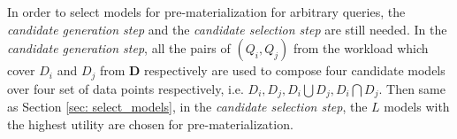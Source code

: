 In order to select models for pre-materialization for arbitrary queries, the {\em candidate generation step} and the {\em candidate selection step} are still needed. In the {\em candidate generation step}, all the pairs of $(Q_i, Q_j)$ from the workload which cover $D_i$ and $D_j$ from $\textbf{D}$ respectively are used to compose four candidate models over four set of data points respectively, i.e. $D_i, D_j, D_i \bigcup D_j, D_i \bigcap D_j$. Then same as Section \ref{sec: select_models}, in the {\em candidate selection step}, the $L$ models with the highest utility are chosen for pre-materialization.

